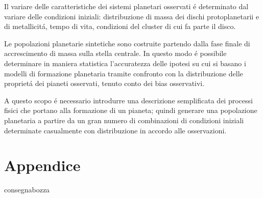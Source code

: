 \documentclass[twoside,11pt,fleqn]{memoir}%
\def\versione{consegna}%
\def\bozza{bozza}
\begin{document}
Il variare delle caratteristiche dei sistemi planetari osservati \'e determinato dal variare delle condizioni iniziali: distribuzione di massa dei dischi protoplanetarii e di metallicit\'a, tempo di vita, condizioni del cluster di cui fa parte il disco.

Le popolazioni planetarie sintetiche sono costruite partendo dalla fase finale di accrescimento di massa sulla stella centrale. In questo modo \'e possibile determinare in maniera statistica l'accuratezza delle ipotesi su cui si basano i modelli di formazione planetaria tramite confronto con la distribuzione delle propriet\'a dei pianeti osservati, tenuto conto dei bias osservativi.

A questo scopo  \'e necessario introdurre una descrizione semplificata dei processi fisici che portano alla formazione di un pianeta; quindi generare una popolazione planetaria a partire da un gran numero di combinazioni di condizioni iniziali determinate casualmente con distribuzione in accordo alle osservazioni.


\cleartorecto



{\let\clearpage\relax\let\cleardoublepage\relax
\backmatter
}

\appendix
\part{Appendice}

\printbibliography
\ifx\versione\bozza
\woc
\erratac
\fi
\end{document}
